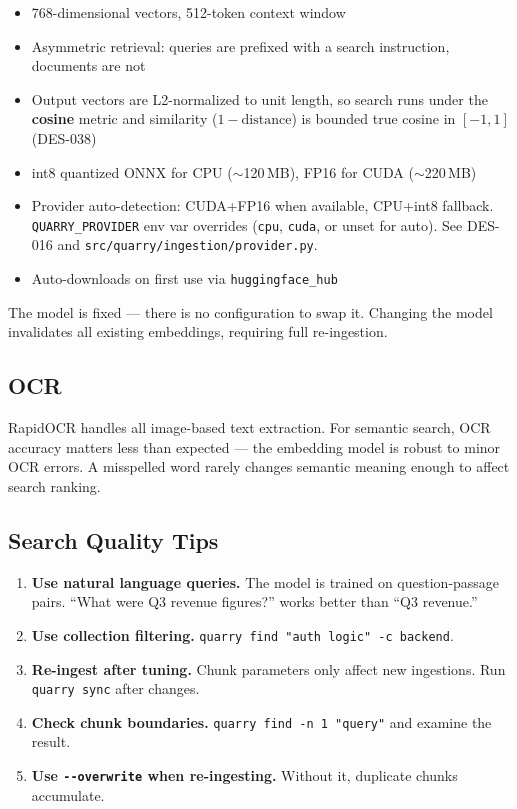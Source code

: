 \documentclass[a4paper,10pt]{article}
\newcommand{\modpath}[1]{\texttt{src/quarry/#1}}
\begin{document}
\begin{itemize}
  \item 768-dimensional vectors, 512-token context window
  \item Asymmetric retrieval: queries are prefixed with a search
    instruction, documents are not
  \item Output vectors are L2-normalized to unit length, so search runs
    under the \textbf{cosine} metric and similarity
    ($1 - \text{distance}$) is bounded true cosine in $[-1, 1]$
    (DES-038)
  \item int8 quantized ONNX for CPU ($\sim$120\,MB), FP16 for CUDA
    ($\sim$220\,MB)
  \item Provider auto-detection: CUDA+FP16 when available, CPU+int8
    fallback.  \texttt{QUARRY\_PROVIDER} env var overrides
    (\texttt{cpu}, \texttt{cuda}, or unset for auto).
    See DES-016 and \modpath{ingestion/provider.py}.
  \item Auto-downloads on first use via \texttt{huggingface\_hub}
\end{itemize}

The model is fixed --- there is no configuration to swap it.  Changing
the model invalidates all existing embeddings, requiring full
re-ingestion.

\subsection{OCR}

RapidOCR handles all image-based text extraction.  For semantic
search, OCR accuracy matters less than expected --- the embedding
model is robust to minor OCR errors.  A misspelled word rarely
changes semantic meaning enough to affect search ranking.

\subsection{Search Quality Tips}

\begin{enumerate}
  \item \textbf{Use natural language queries.}  The model is trained on
    question-passage pairs.  ``What were Q3 revenue figures?'' works
    better than ``Q3 revenue.''
  \item \textbf{Use collection filtering.}
    \texttt{quarry find "auth logic" -c backend}.
  \item \textbf{Re-ingest after tuning.}  Chunk parameters only affect
    new ingestions.  Run \texttt{quarry sync} after changes.
  \item \textbf{Check chunk boundaries.}
    \texttt{quarry find -n 1 "query"} and examine the result.
  \item \textbf{Use \texttt{-{}-overwrite} when re-ingesting.}
    Without it, duplicate chunks accumulate.
\end{enumerate}
\end{document}
